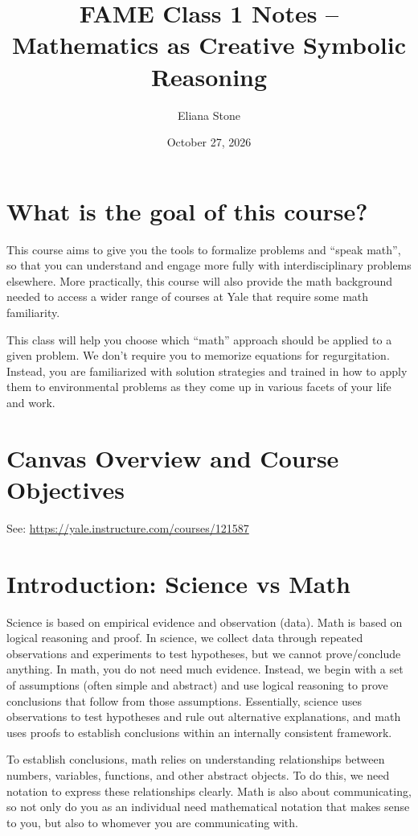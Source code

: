 \documentclass[12pt]{article}
\title{FAME Class 1 Notes -- Mathematics as Creative Symbolic Reasoning}
\author{Eliana Stone}
\date{October 27, 2026}
\begin{document}
\maketitle
\section{What is the goal of this course?}
This course aims to give you the tools to formalize problems and ``speak math'', so that you can understand and engage more fully with interdisciplinary problems elsewhere. More practically, this course will also provide the math background needed to access a wider range of courses at Yale that require some math familiarity. 

This class will help you choose which ``math'' approach should be applied to a given problem. We don't require you to memorize equations for regurgitation. Instead, you are familiarized with solution strategies and trained in how to apply them to environmental problems as they come up in various facets of your life and work.

\section{Canvas Overview and Course Objectives}

See: \hyperlink{Canvas}{https://yale.instructure.com/courses/121587}

\section{Introduction: Science vs Math}
Science is based on empirical evidence and observation (data). Math is based on logical reasoning and proof. In science, we collect data through repeated observations and experiments to test hypotheses, but we cannot prove/conclude anything. In math, you do not need much evidence. Instead, we begin with a set of assumptions (often simple and abstract) and use logical reasoning to prove conclusions that follow from those assumptions. Essentially, science uses observations to test hypotheses and rule out alternative explanations, and math uses proofs to establish conclusions within an internally consistent framework.

To establish conclusions, math relies on understanding relationships between numbers, variables, functions, and other abstract objects. To do this, we need notation to express these relationships clearly. Math is also about communicating, so not only do you as an individual need mathematical notation that makes sense to you, but also to whomever you are communicating with.
\end{document}
